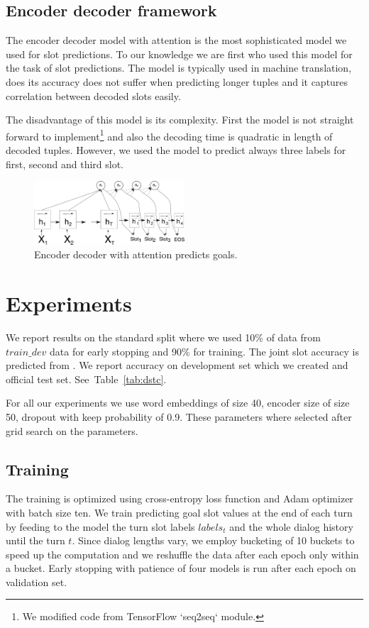 \documentclass{itatnew}
\begin{document}
\subsection{Encoder decoder framework}
\label{sec:encdec}
The encoder decoder model with attention\cite{bahdanau2014neural} is the most sophisticated model we used for slot predictions.
To our knowledge we are first who used this model for the task of slot predictions.
The model is typically used in machine translation, does its accuracy does not suffer when predicting longer tuples\cite{bahdanau2014neural} and it captures correlation between decoded slots easily.

The disadvantage of this model is its complexity.
First the model is not straight forward to implement\footnote{We modified code from TensorFlow `seq2seq` module.} and also the decoding time is quadratic in length of decoded tuples.
However, we used the model to predict always three labels for first, second and third slot.
\begin{figure}
\includegraphics[width=0.5\textwidth]{encdec}
\caption{Encoder decoder with attention predicts goals.}
\label{fig:encdec}
\end{figure}

\section{Experiments}
\label{sec:exp}
We report results on the standard split where we used 10\% of data from $train\_dev$ data for early stopping\cite{prechelt1998early} and 90\% for training.
The joint slot accuracy is predicted from .
We report accuracy  on development set which we created and official test set. See~Table~\ref{tab:dstc}.

For all our experiments we use word embeddings of size 40, encoder size of size 50, dropout with keep probability of 0.9.
These parameters where selected after grid search on the parameters.

\subsection{Training}
\label{sec:train}
The training is optimized using cross-entropy loss function and Adam optimizer\cite{kingma2014adam} with batch size ten.
We train predicting goal slot values at the end of each turn by feeding to the model the turn slot labels $labels_t$ and the whole dialog history until the turn $t$.
Since dialog lengths vary, we employ bucketing of 10 buckets to speed up the computation and we reshuffle the data after each epoch only within a bucket.
Early stopping with patience of four models is run after each epoch on validation set.
\end{document}
